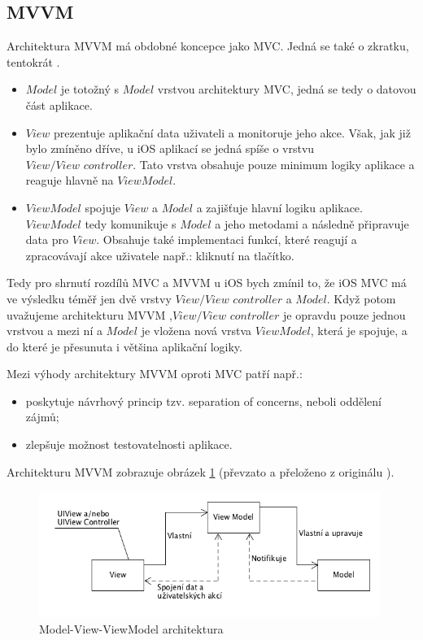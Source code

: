 \documentclass[thesis=M,czech]{FITthesis}[2012/06/26]
\begin{document}
\subsection{MVVM}
Architektura MVVM má obdobné koncepce jako MVC. Jedná se také o zkratku, tentokrát . \cite{MVVMMicrosoft}
\begin{itemize}
\item $Model$ je totožný s $Model$ vrstvou architektury MVC, jedná se tedy o datovou část aplikace.
\item $View$ prezentuje aplikační data uživateli a monitoruje jeho akce. Však, jak již bylo zmíněno dříve, u iOS aplikací se jedná spíše o vrstvu\\ $View/View$ $controller$. Tato vrstva obsahuje pouze minimum logiky aplikace a reaguje hlavně na $ViewModel$.  \cite{Morrison}
\item $ViewModel$ spojuje $View$ a $Model$ a zajišťuje hlavní logiku aplikace. $ViewModel$ tedy komunikuje s  $Model$ a jeho metodami a následně připravuje data pro $View$. Obsahuje také implementaci funkcí, které reagují a zpracovávají akce uživatele např.: kliknutí na tlačítko. \cite{MVVMMicrosoft}
\end{itemize}

Tedy pro shrnutí rozdílů MVC a MVVM u iOS bych zmínil to, že iOS MVC má ve výsledku téměř jen dvě vrstvy $View/View$ $controller$ a $Model$. Když potom uvažujeme architekturu MVVM ,$View/View$ $controller$  je opravdu pouze jednou vrstvou a mezi ní a $Model$ je vložena nová vrstva  $ViewModel$, která je spojuje, a do které je přesunuta i většina aplikační logiky.

Mezi výhody architektury MVVM oproti MVC patří např.:
\begin{itemize}
\item poskytuje návrhový princip tzv. separation of concerns, neboli oddělení zájmů;
\item zlepšuje možnost testovatelnosti aplikace.
\end{itemize}

Architekturu MVVM zobrazuje obrázek \ref{fig:mvvm} (převzato a přeloženo z originálu \cite{mvvm-pic}).

\begin{figure}[h]\centering
 \includegraphics[width=0.99\textwidth]{./pictures/architektury/MVVM}
 \caption[Model-View-ViewModel architektura]{Model-View-ViewModel architektura}\label{fig:mvvm}
\end{figure}
\end{document}
